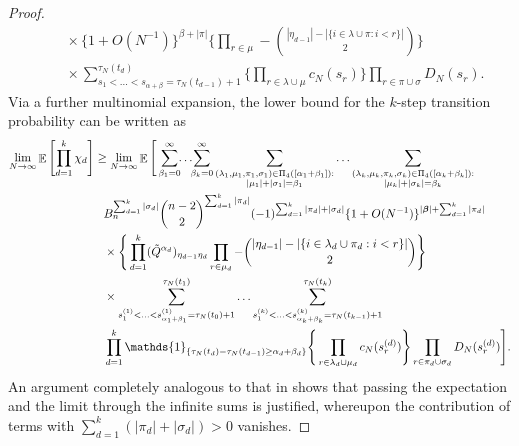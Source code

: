 \documentclass{article} %
\theoremstyle{definition}
\DeclareMathOperator{\E}{\mathbb{E}}
\newcommand{\1}[1]{\mathbbm{1}_{\{#1\}}}
\begin{document}
\begin{proof}
\begin{align*}
&\phantom{\geq} \times \{ 1 + O( N^{ -1 } ) \}^{ \beta + | \pi | } \Bigg\{ \prod_{ r \in \mu } - \binom{ | \eta_{ d - 1 } | - | \{ i \in \lambda \cup \pi : i < r \} | }{ 2 } \Bigg\} \\
&\phantom{\geq} \times \sum_{ s_1 < \ldots < s_{ \alpha + \beta } = \tau_N( t_{ d - 1 } ) + 1 }^{ \tau_N( t_d ) } \Bigg\{ \prod_{ r \in \lambda \cup \mu } c_N( s_r ) \Bigg\} \prod_{ r \in \pi \cup \sigma }  D_N( s_r ) .
\end{align*}
Via a further multinomial expansion, the lower bound for the $k$-step transition probability can be written as
\begin{align*}
\lim_{ N \rightarrow \infty } \E\left[ \prod_{ d = 1 }^k \chi_d \right]
&\geq \lim_{ N \rightarrow \infty } \E\Bigg[ \sum_{ \beta_1 = 0 }^{ \infty } \mkern-6mu \ldots \mkern-6mu \sum_{ \beta_k = 0 }^{ \infty } \sum_{\substack{ ( \lambda_1, \mu_1, \pi_1, \sigma_1 ) \in \Pi_4( [ \alpha_1 + \beta_1 ] ):\\  | \mu_1 | + | \sigma_1 | = \beta_1 }} \ldots 
\sum_{\substack{ ( \lambda_k, \mu_k, \pi_k, \sigma_k ) \in \Pi_4( [ \alpha_k + \beta_k ] ) :\\ | \mu_k | + | \sigma_k | = \beta_k }} \\
&\phantom{\geq} B_n^{ \sum_{ d = 1 }^k | \sigma_d | } \binom{ n - 2 }{ 2 }^{ \sum_{ d = 1 }^k| \pi_d | }
( -1 )^{ \sum_{ d = 1 }^k | \pi_d | + | \sigma_d | }  \{ 1 + O( N^{ -1 } ) \}^{ | \bm{ \beta } | + \sum_{ d = 1 }^k | \pi_d | } \\
&\phantom{\geq} \times \Bigg\{ \prod_{ d = 1 }^k ( \tilde{ Q }^{ \alpha_d } )_{ \eta_{ d - 1 } \eta_d } \prod_{ r \in \mu_d } - \binom{ | \eta_{ d - 1 } | - | \{ i \in \lambda_d \cup \pi_d : i < r \} | }{ 2 } \Bigg\} \\
&\phantom{\geq} \times \sum_{ s_1^{ ( 1 ) } < \ldots < s_{ \alpha_1 + \beta_1 }^{ ( 1 ) } = \tau_N( t_0 ) + 1 }^{ \tau_N( t_1 ) } \ldots \sum_{ s_1^{ ( k ) } < \ldots < s_{ \alpha_k + \beta_k }^{ ( k ) } = \tau_N( t_{ k - 1 } ) + 1 }^{ \tau_N( t_k ) } \\
&\phantom{\geq} \prod_{ d = 1 }^k \mathds{ 1 }_{ \{ \tau_N( t_d ) - \tau_N( t_{ d - 1 } ) \geq \alpha_d + \beta_d \} } \Bigg\{ \prod_{ r \in \lambda_d \cup \mu_d } c_N( s_r^{ ( d ) } ) \Bigg\} \prod_{ r \in \pi_d \cup \sigma_d }  D_N( s_r^{ ( d ) } ) \Bigg].
\end{align*}
An argument completely analogous to that in \cite[Appendix]{koskela2018} shows that passing the expectation and the limit through the infinite sums is justified, whereupon the contribution of terms with $ \sum_{ d = 1 }^k ( | \pi_d | + | \sigma_d | ) > 0$ vanishes.

\end{proof}
\end{document}
